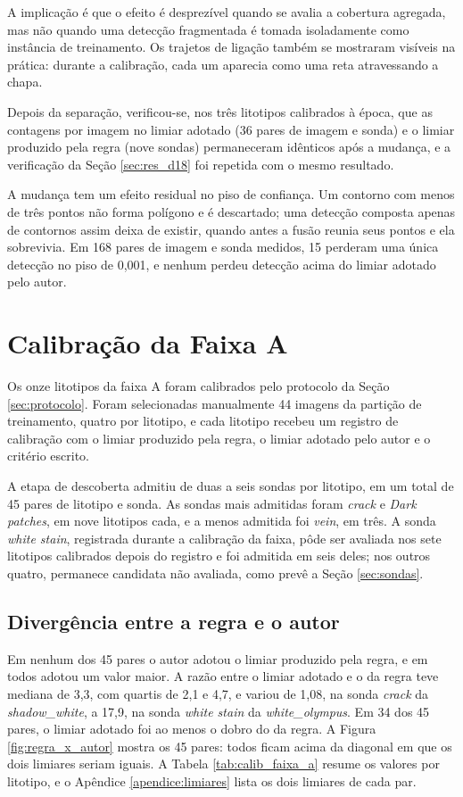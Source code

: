 A implicação é que o efeito é desprezível quando se avalia a cobertura agregada, mas não quando uma detecção fragmentada é tomada isoladamente como instância de treinamento. Os trajetos de ligação também se mostraram visíveis na prática: durante a calibração, cada um aparecia como uma reta atravessando a chapa.

Depois da separação, verificou-se, nos três litotipos calibrados à época, que as contagens por imagem no limiar adotado (36 pares de imagem e sonda) e o limiar produzido pela regra (nove sondas) permaneceram idênticos após a mudança, e a verificação da Seção \ref{sec:res_d18} foi repetida com o mesmo resultado.

A mudança tem um efeito residual no piso de confiança. Um contorno com menos de três pontos não forma polígono e é descartado; uma detecção composta apenas de contornos assim deixa de existir, quando antes a fusão reunia seus pontos e ela sobrevivia. Em 168 pares de imagem e sonda medidos, 15 perderam uma única detecção no piso de 0,001, e nenhum perdeu detecção acima do limiar adotado pelo autor.

\section{Calibração da Faixa A}
\label{sec:res_calibracao}

Os onze litotipos da faixa A foram calibrados pelo protocolo da Seção \ref{sec:protocolo}. Foram selecionadas manualmente 44 imagens da partição de treinamento, quatro por litotipo, e cada litotipo recebeu um registro de calibração com o limiar produzido pela regra, o limiar adotado pelo autor e o critério escrito.

A etapa de descoberta admitiu de duas a seis sondas por litotipo, em um total de 45 pares de litotipo e sonda. As sondas mais admitidas foram \textit{crack} e \textit{Dark patches}, em nove litotipos cada, e a menos admitida foi \textit{vein}, em três. A sonda \textit{white stain}, registrada durante a calibração da faixa, pôde ser avaliada nos sete litotipos calibrados depois do registro e foi admitida em seis deles; nos outros quatro, permanece candidata não avaliada, como prevê a Seção \ref{sec:sondas}.

\subsection{Divergência entre a regra e o autor}

Em nenhum dos 45 pares o autor adotou o limiar produzido pela regra, e em todos adotou um valor maior. A razão entre o limiar adotado e o da regra teve mediana de 3,3, com quartis de 2,1 e 4,7, e variou de 1,08, na sonda \textit{crack} da \textit{shadow\_white}, a 17,9, na sonda \textit{white stain} da \textit{white\_olympus}. Em 34 dos 45 pares, o limiar adotado foi ao menos o dobro do da regra. A Figura \ref{fig:regra_x_autor} mostra os 45 pares: todos ficam acima da diagonal em que os dois limiares seriam iguais. A Tabela \ref{tab:calib_faixa_a} resume os valores por litotipo, e o Apêndice \ref{apendice:limiares} lista os dois limiares de cada par.


